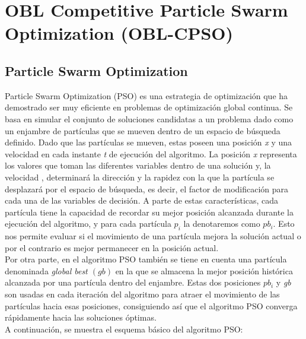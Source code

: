 



\section{OBL Competitive Particle Swarm Optimization (OBL-CPSO)}
\label{sec:OBL-CPSO}

\subsection{Particle Swarm Optimization}
Particle Swarm Optimization (PSO) \cite{metabook, comparison, PSO_KA, GPSO} es una estrategia de optimización que ha demostrado ser muy eficiente en problemas de optimización global continua. Se basa en simular el conjunto de soluciones candidatas a un problema dado como un enjambre de partículas que se mueven dentro de un espacio de búsqueda definido. Dado que las partículas se mueven, estas poseen una posición \textit{x} y una velocidad  en cada instante \textit{t} de ejecución del algoritmo. La posición \textit{x} representa los valores que toman las diferentes variables dentro de una solución y, la velocidad , determinará la dirección y la rapidez con la que la partícula se desplazará por el espacio de búsqueda, es decir, el factor de modificación para cada una de las variables de decisión. A parte de estas características, cada partícula tiene la capacidad de recordar su mejor posición alcanzada durante la ejecución del algoritmo, y para cada partícula $p_{i}$ la denotaremos como $pb_{i}$\cite{metabook}. Esto nos permite evaluar si el movimiento de una partícula mejora la solución actual o por el contrario es mejor permanecer en la posición actual. \\

Por otra parte, en el algoritmo PSO también se tiene en cuenta una partícula denominada \textit{global best $(gb)$} en la que se almacena la mejor posición histórica alcanzada por una partícula dentro del enjambre. Estas dos posiciones $pb_{i}$ y \textit{gb} son usadas en cada iteración del algoritmo para atraer el movimiento de las partículas hacia esas posiciones, consiguiendo así que el algoritmo PSO converga rápidamente hacia las soluciones óptimas. \\
A continuación, se muestra el esquema básico del algoritmo PSO: 


